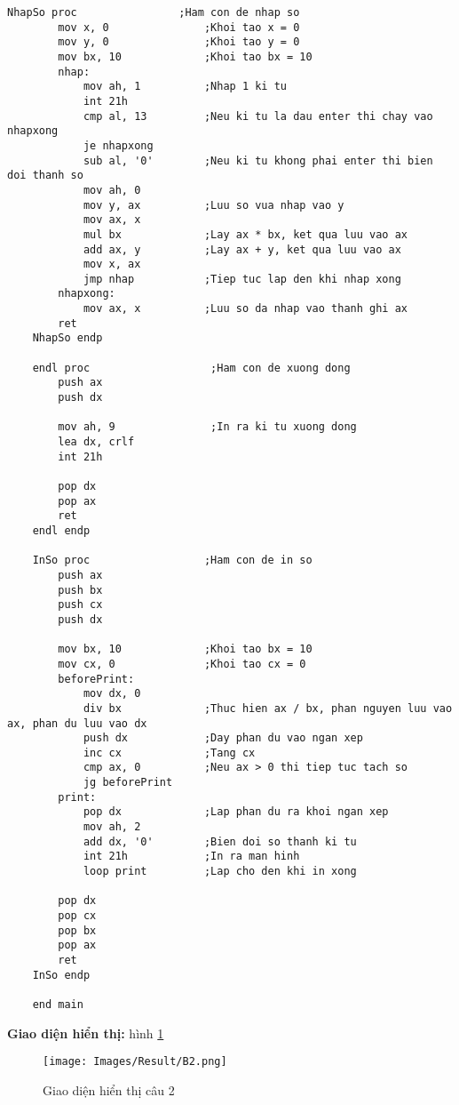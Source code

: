 \begin{lstlisting}[style=asm, caption={Mã nguồn câu 2}]
    NhapSo proc                ;Ham con de nhap so
        mov x, 0               ;Khoi tao x = 0
        mov y, 0               ;Khoi tao y = 0
        mov bx, 10             ;Khoi tao bx = 10
        nhap:   
            mov ah, 1          ;Nhap 1 ki tu
            int 21h 
            cmp al, 13         ;Neu ki tu la dau enter thi chay vao nhapxong
            je nhapxong
            sub al, '0'        ;Neu ki tu khong phai enter thi bien doi thanh so
            mov ah, 0
            mov y, ax          ;Luu so vua nhap vao y
            mov ax, x
            mul bx             ;Lay ax * bx, ket qua luu vao ax
            add ax, y          ;Lay ax + y, ket qua luu vao ax
            mov x, ax          
            jmp nhap           ;Tiep tuc lap den khi nhap xong
        nhapxong:
            mov ax, x          ;Luu so da nhap vao thanh ghi ax
        ret
    NhapSo endp 
    
    endl proc                   ;Ham con de xuong dong
        push ax
        push dx
        
        mov ah, 9               ;In ra ki tu xuong dong
        lea dx, crlf
        int 21h
        
        pop dx
        pop ax
        ret
    endl endp  
    
    InSo proc                  ;Ham con de in so
        push ax
        push bx
        push cx
        push dx
        
        mov bx, 10             ;Khoi tao bx = 10
        mov cx, 0              ;Khoi tao cx = 0
        beforePrint:
            mov dx, 0
            div bx             ;Thuc hien ax / bx, phan nguyen luu vao ax, phan du luu vao dx
            push dx            ;Day phan du vao ngan xep
            inc cx             ;Tang cx 
            cmp ax, 0          ;Neu ax > 0 thi tiep tuc tach so
            jg beforePrint
        print:
            pop dx             ;Lap phan du ra khoi ngan xep
            mov ah, 2          
            add dx, '0'        ;Bien doi so thanh ki tu
            int 21h            ;In ra man hinh
            loop print         ;Lap cho den khi in xong
        
        pop dx
        pop cx
        pop bx
        pop ax
        ret
    InSo endp
    
    end main
\end{lstlisting}

\vspace{0.5cm}
\noindent\textbf{\large Giao diện hiển thị: } hình \ref{fig:result-2}

\begin{figure}[H]
    \centering
    \texttt{[image: Images/Result/B2.png]}
    \caption{Giao diện hiển thị câu 2}
    \label{fig:result-2}
\end{figure}

